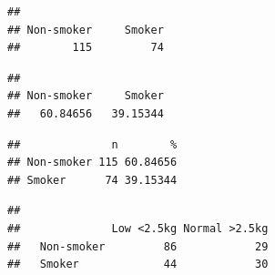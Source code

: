 \documentclass[]{book}
\newenvironment{Shaded}{\begin{snugshade}}{\end{snugshade}}
\newcommand{\KeywordTok}[1]{\textcolor[rgb]{0.13,0.29,0.53}{\textbf{#1}}}
\newcommand{\DataTypeTok}[1]{\textcolor[rgb]{0.13,0.29,0.53}{#1}}
\newcommand{\DecValTok}[1]{\textcolor[rgb]{0.00,0.00,0.81}{#1}}
\newcommand{\StringTok}[1]{\textcolor[rgb]{0.31,0.60,0.02}{#1}}
\newcommand{\CommentTok}[1]{\textcolor[rgb]{0.56,0.35,0.01}{\textit{#1}}}
\newcommand{\OperatorTok}[1]{\textcolor[rgb]{0.81,0.36,0.00}{\textbf{#1}}}
\newcommand{\NormalTok}[1]{#1}
\theoremstyle{definition}
\theoremstyle{definition}
\theoremstyle{remark}
\begin{document}
\begin{Shaded}
\end{Shaded}

\begin{verbatim}
## 
## Non-smoker     Smoker 
##        115         74
\end{verbatim}

\begin{Shaded}
\end{Shaded}

\begin{verbatim}
## 
## Non-smoker     Smoker 
##   60.84656   39.15344
\end{verbatim}

\begin{Shaded}
\end{Shaded}

\begin{verbatim}
##              n        %
## Non-smoker 115 60.84656
## Smoker      74 39.15344
\end{verbatim}

\begin{Shaded}
\end{Shaded}

\begin{verbatim}
##             
##              Low <2.5kg Normal >2.5kg
##   Non-smoker         86            29
##   Smoker             44            30
\end{verbatim}
\end{document}
